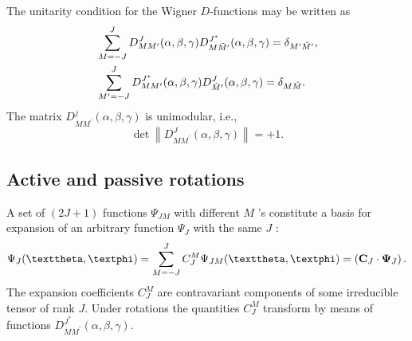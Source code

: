 The unitarity condition for the Wigner $D$-functions may be written as
\begin{align}
& \sum_{M=-J}^{J} D_{M M^{\prime}}^{J}(\alpha, \beta, \gamma) D_{M \tilde{M}^{\prime}}^{J^{*}}(\alpha, \beta, \gamma)=\delta_{M^{\prime} \tilde{M}^{\prime}},  \notag\\
& \sum_{M^{\prime}=-J}^{J} D_{M M^{\prime}}^{J^{*}}(\alpha, \beta, \gamma) D_{\tilde{M}^{\prime}}^{J}(\alpha, \beta, \gamma)=\delta_{M \tilde{M}} . \label{eq:4:1:6}
\end{align}
The matrix $D_{M M^{\prime}}^{j}(\alpha, \beta, \gamma)$ is unimodular, i.e.,
\begin{equation}
\det\left\|D_{M M^{\prime}}^{J}(\alpha, \beta, \gamma)\right\|=+1 . \label{eq:4:1:7}
\end{equation}
\subsection{Active and passive rotations}
 A set of $(2 J+1)$ functions $\Psi_{J M}$ with different $M$ 's constitute a basis for expansion of an arbitrary function $\Psi_{J}$ with the same $J$ :
\begin{equation}
\Psi_{J}(\vartheta, \varphi)=\sum_{M=-J}^{J} C_{J}^{M} \Psi_{J M}(\vartheta, \varphi)=\left(\vect{C}_{J} \cdot \boldsymbol{\Psi}_{J}\right) . \label{eq:4:1:8}
\end{equation}
The expansion coefficients $C_{J}^{M}$ are contravariant components of some irreducible tensor of rank $J$. Under rotations the quantities $C_{J}^{M}$ transform by means of functions $D_{M M^{\prime}}^{J^{*}}(\alpha, \beta, \gamma)$.

